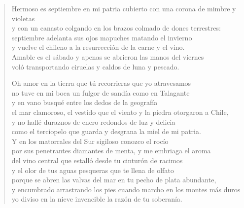 \documentclass[12pt]{article}
\begin{document}
\clearpage
{}
\begin{verse}

Hermoso es septiembre en mi patria cubierto con una corona de mimbre y violetas\\
y con un canasto colgando en los brazos colmado de dones terrestres:\\
septiembre adelanta sus ojos mapuches matando el invierno\\
y vuelve el chileno a la resurrección de la carne y el vino.\\
Amable es el sábado y apenas se abrieron las manos del viernes\\
voló transportando ciruelas y caldos de luna y pescado.  

Oh amor en la tierra que tú recorrieras que yo atravesamos\\
no tuve en mi boca un fulgor de sandía como en Talagante\\
y en vano busqué entre los dedos de la geografía\\
el mar clamoroso, el vestido que el viento y la piedra otorgaron a Chile,\\
y no hallé duraznos de enero redondos de luz y delicia\\
como el terciopelo que guarda y desgrana la miel de mi patria.\\
Y en los matorrales del Sur sigiloso conozco el rocío\\
por sus penetrantes diamantes de menta, y me embriaga el aroma\\
del vino central que estalló desde tu cinturón de racimos\\
y el olor de tus aguas pesqueras que te llena de olfato\\
porque se abren las valvas del mar en tu pecho de plata abundante,\\
y encumbrado arrastrando los pies cuando marcho en los montes más duros\\
yo diviso en la nieve invencible la razón de tu soberanía.  

\end{verse}
\end{document}
